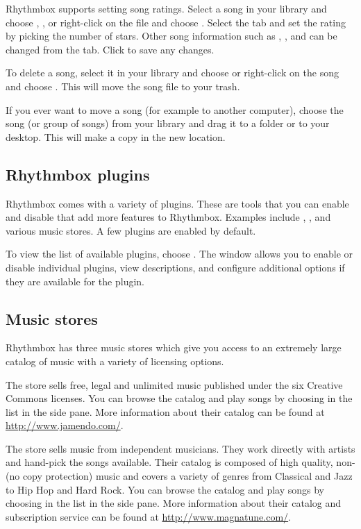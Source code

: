 Rhythmbox supports setting song ratings. Select a song in your library and
choose , , or right-click on the file and choose . Select the  tab and set the rating by picking the number of stars. Other song information such as , , and  can be changed from the  tab. Click  to save any changes.

To delete a song, select it in your library and choose  or right-click on the song and choose . This will move the song file to your trash.

If you ever want to move a song (for example to another computer), choose the song (or group of songs) from your library and drag it to a folder or to your desktop. This will make a copy in the new location.

\subsection{Rhythmbox plugins}
Rhythmbox comes with a variety of plugins. These are tools that you can enable and disable that add more features to Rhythmbox. Examples include , , and various music stores. A few plugins are enabled by default.

To view the list of available plugins, choose . The  window allows you to enable or disable individual plugins, view descriptions, and configure additional options if they are available for the plugin.

\subsection{Music stores}
Rhythmbox has three music stores which give you access to an extremely large catalog of music with a variety of licensing options.

The  store sells free, legal and unlimited music published under the six Creative Commons licenses. You can browse the catalog and play songs by choosing  in the  list in the side pane. More information about their catalog can be found at \url{http://www.jamendo.com/}.

The  store sells music from independent musicians. They work directly with artists and hand-pick the songs available. Their catalog is composed of high quality, non- (no copy protection) music and covers a variety of genres from Classical and Jazz to Hip Hop and Hard Rock. You can browse the catalog and play songs by choosing  in the  list in the side pane. More information about their catalog and subscription service can be found at \url{http://www.magnatune.com/}.

